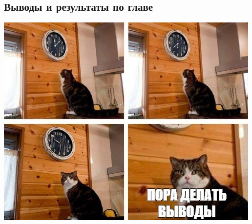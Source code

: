 \subsection{Выводы и результаты по главе}

\includegraphics[width=0.75\linewidth]{img/conclusion_cat}

\TODO